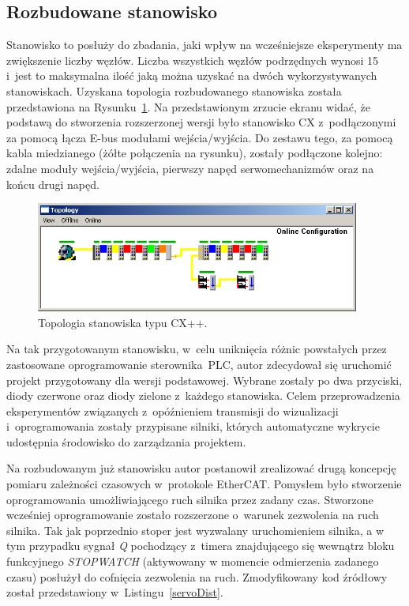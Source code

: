 \subsection{Rozbudowane stanowisko}
Stanowisko to posłuży do zbadania, jaki wpływ na wcześniejsze eksperymenty ma zwiększenie liczby węzłów. Liczba wszystkich węzłów podrzędnych wynosi 15 i~jest to maksymalna ilość jaką można uzyskać na dwóch wykorzystywanych stanowiskach. Uzyskana topologia rozbudowanego stanowiska została przedstawiona na Rysunku~\ref{topology:cx++}.
Na przedstawionym zrzucie ekranu widać, że podstawą do stworzenia rozszerzonej wersji było stanowisko CX z~podłączonymi za pomocą łącza E-bus modułami wejścia/wyjścia. Do zestawu tego, za pomocą kabla miedzianego (żółte połączenia na rysunku), zostały podłączone kolejno: zdalne moduły wejścia/wyjścia, pierwszy napęd serwomechanizmów oraz na końcu drugi napęd.

\begin{figure}[!htb] 	\centering 	\includegraphics[width=0.95\textwidth]{images/topologyCX++} \caption{Topologia stanowiska typu CX++.} \label{topology:cx++} \end{figure}

Na tak przygotowanym stanowisku, w~celu uniknięcia różnic powstałych przez zastosowane oprogramowanie sterownika~PLC, autor zdecydował się uruchomić projekt przygotowany dla wersji podstawowej. Wybrane zostały po dwa przyciski, diody czerwone oraz diody zielone z~każdego stanowiska. Celem przeprowadzenia eksperymentów związanych z~opóźnieniem transmisji do wizualizacji i~oprogramowania zostały przypisane silniki, których automatyczne wykrycie udostępnia środowisko do zarządzania projektem.

\vspace{1cm}
Na rozbudowanym już stanowisku autor postanowił zrealizować drugą koncepcję pomiaru zależności czasowych w~protokole EtherCAT. Pomysłem było stworzenie oprogramowania umożliwiającego ruch silnika przez zadany czas. Stworzone wcześniej oprogramowanie zostało rozszerzone o~warunek zezwolenia na ruch silnika. Tak jak poprzednio stoper jest wyzwalany uruchomieniem silnika, a w tym przypadku sygnał \textit{Q} pochodzący z~timera znajdującego się wewnątrz bloku funkcyjnego \textit{STOPWATCH} (aktywowany w momencie odmierzenia zadanego czasu) posłużył do cofnięcia zezwolenia na ruch. Zmodyfikowany kod źródłowy został przedstawiony w~Listingu~\ref{servoDist}.

